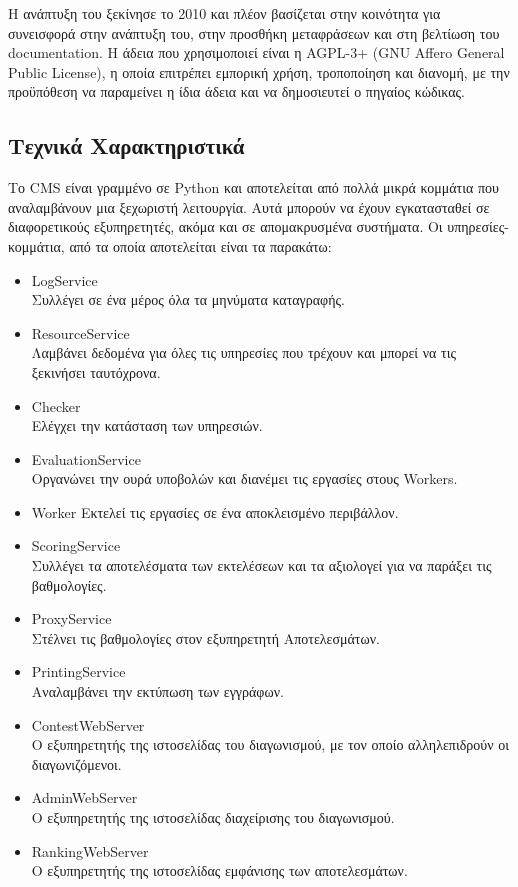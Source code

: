 \documentclass[diploma]{softlab-thesis}
\begin{document}
\bigskip

Η ανάπτυξη του ξεκίνησε το 2010 και πλέον βασίζεται στην κοινότητα για
συνεισφορά στην ανάπτυξη του, στην προσθήκη μεταφράσεων και στη βελτίωση του
documentation. H άδεια που χρησιμοποιεί είναι η AGPL-3+ (GNU Affero General
Public License), η οποία επιτρέπει εμπορική χρήση, τροποποίηση και διανομή, με
την προϋπόθεση να παραμείνει η ίδια άδεια και να δημοσιευτεί ο πηγαίος κώδικας.

\subsection{Τεχνικά Χαρακτηριστικά}

Το CMS είναι γραμμένο σε Python και αποτελείται από πολλά μικρά κομμάτια που
αναλαμβάνουν μια ξεχωριστή λειτουργία. Αυτά μπορούν να έχουν εγκατασταθεί σε
διαφορετικούς εξυπηρετητές, ακόμα και σε απομακρυσμένα συστήματα. Οι
υπηρεσίες-κομμάτια, από τα οποία αποτελείται είναι τα παρακάτω:

\begin{itemize}
    \setlength\itemsep{0em}
    \item LogService \\
      Συλλέγει σε ένα μέρος όλα τα μηνύματα καταγραφής.
    \item ResourceService \\
      Λαμβάνει δεδομένα για όλες τις υπηρεσίες που τρέχουν και μπορεί να τις
      ξεκινήσει ταυτόχρονα.
    \item Checker \\
      Ελέγχει την κατάσταση των υπηρεσιών.
    \item EvaluationService \\
      Οργανώνει την ουρά υποβολών και διανέμει τις εργασίες στους Workers.
    \item Worker
      Εκτελεί τις εργασίες σε ένα αποκλεισμένο περιβάλλον.
    \item ScoringService \\
      Συλλέγει τα αποτελέσματα των εκτελέσεων και τα αξιολογεί για να παράξει
      τις βαθμολογίες.
    \item ProxyService \\
      Στέλνει τις βαθμολογίες στον εξυπηρετητή Αποτελεσμάτων.
      \cite{maggiolo2014cms}
    \item PrintingService \\
      Αναλαμβάνει την εκτύπωση των εγγράφων.
    \item ContestWebServer \\
      Ο εξυπηρετητής της ιστοσελίδας του διαγωνισμού, με τον οποίο αλληλεπιδρούν
      οι διαγωνιζόμενοι.
    \item AdminWebServer \\
      Ο εξυπηρετητής της ιστοσελίδας διαχείρισης του διαγωνισμού.
    \item RankingWebServer \\
      Ο εξυπηρετητής της ιστοσελίδας εμφάνισης των αποτελεσμάτων.
\end{itemize}
\end{document}
